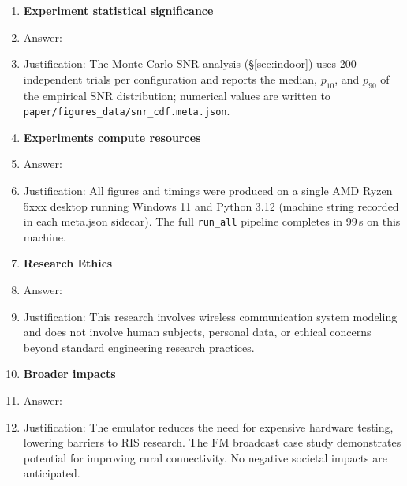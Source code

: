 \documentclass{article}
\begin{document}
\begin{enumerate}
\item {\bf Experiment statistical significance}
    \item[] Answer: \answerYes{}
    \item[] Justification: The Monte Carlo SNR analysis (\S\ref{sec:indoor}) uses 200 independent trials per configuration and reports the median, $p_{10}$, and $p_{90}$ of the empirical SNR distribution; numerical values are written to \texttt{paper/figures\_data/snr\_cdf.meta.json}.

\item {\bf Experiments compute resources}
    \item[] Answer: \answerYes{}
    \item[] Justification: All figures and timings were produced on a single AMD Ryzen 5xxx desktop running Windows 11 and Python 3.12 (machine string recorded in each meta.json sidecar). The full \texttt{run\_all} pipeline completes in 99\,s on this machine.

\item {\bf Research Ethics}
    \item[] Answer: \answerYes{}
    \item[] Justification: This research involves wireless communication system modeling and does not involve human subjects, personal data, or ethical concerns beyond standard engineering research practices.

\item {\bf Broader impacts}
    \item[] Answer: \answerYes{}
    \item[] Justification: The emulator reduces the need for expensive hardware testing, lowering barriers to RIS research. The FM broadcast case study demonstrates potential for improving rural connectivity. No negative societal impacts are anticipated.
\end{enumerate}
\end{document}
